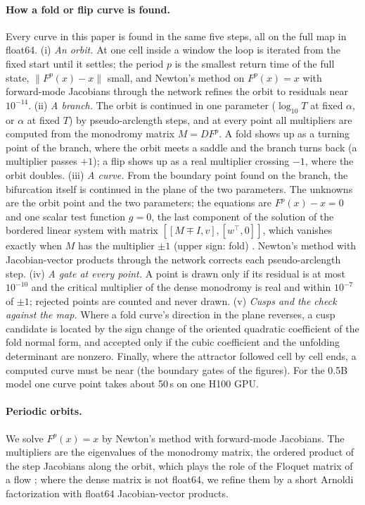 \documentclass[11pt,letterpaper]{article}
\begin{document}
\paragraph{How a fold or flip curve is found.} Every curve in this paper is found in the same five steps, all on the
full map in float64.
(i) \emph{An orbit.} At one cell inside a window the loop is iterated from the fixed start until it settles; the
period $p$ is the smallest return time of the full state, $\lVert F^p(x)-x\rVert$ small, and Newton's method on
$F^p(x)=x$ with forward-mode Jacobians through the network refines the orbit to residuals near $10^{-14}$.
(ii) \emph{A branch.} The orbit is continued in one parameter ($\log_{10}T$ at fixed $\alpha$, or $\alpha$ at fixed
$T$) by pseudo-arclength steps, and at every point all multipliers are computed from the monodromy matrix
$M=DF^p$. A fold shows up as a turning point of the branch, where the orbit meets a saddle and the branch turns back
(a multiplier passes $+1$); a flip shows up as a real multiplier crossing $-1$, where the orbit doubles.
(iii) \emph{A curve.} From the boundary point found on the branch, the bifurcation itself is continued in the plane of
the two parameters. The unknowns are the orbit point and the two parameters; the equations are $F^p(x)-x=0$ and one
scalar test function $g=0$, the last component of the solution of the bordered linear system with matrix
$[[M\mp I,v],[w^\top,0]]$, which vanishes exactly when $M$ has the multiplier $\pm1$ (upper sign: fold)
\cite{govaerts2000numerical,kuznetsov2023elements}. Newton's method with Jacobian-vector products through the network
corrects each pseudo-arclength step.
(iv) \emph{A gate at every point.} A point is drawn only if its residual is at most $10^{-10}$ and the critical
multiplier of the dense monodromy is real and within $10^{-7}$ of $\pm1$; rejected points are counted and never
drawn.
(v) \emph{Cusps and the check against the map.} Where a fold curve's direction in the plane reverses, a cusp candidate
is located by the sign change of the oriented quadratic coefficient of the fold normal form, and accepted only if the
cubic coefficient and the unfolding determinant are nonzero. Finally, where the attractor followed cell by cell ends,
a computed curve must be near (the boundary gates of the figures). For the 0.5B model one curve point takes about 50\,s
on one H100 GPU.

\paragraph{Periodic orbits.} We solve $F^p(x)=x$ by Newton's method with forward-mode Jacobians. The multipliers are
the eigenvalues of the monodromy matrix, the ordered product of the step Jacobians along the orbit, which plays the
role of the Floquet matrix of a flow \cite{kuznetsov2023elements}; where the dense matrix is not float64, we refine them by a short Arnoldi
factorization with float64 Jacobian-vector products.
\end{document}
